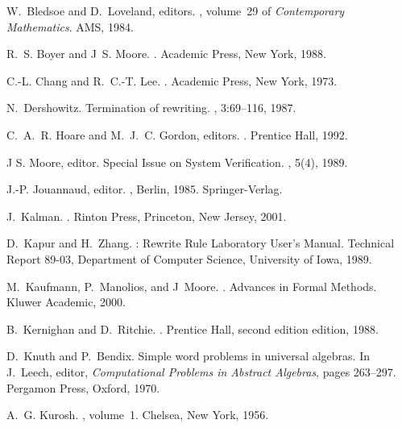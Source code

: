 \documentclass[11pt]{article}
\begin{document}
\begin{thebibliography}{10}

W.~Bledsoe and D.~Loveland, editors.
, volume~29 of {\em
  Contemporary Mathematics}.
\newblock AMS, 1984.

R.~S. Boyer and J~S. Moore.
.
\newblock Academic Press, New York, 1988.

C.-L. Chang and R.~C.-T. Lee.
.
\newblock Academic Press, New York, 1973.

N.~Dershowitz.
\newblock Termination of rewriting.
, 3:69--116, 1987.

C.~A.~R. Hoare and M.~J.~C. Gordon, editors.
.
\newblock Prentice Hall, 1992.

{J S. Moore, editor}.
\newblock Special {I}ssue on {S}ystem {V}erification.
, 5(4), 1989.

J.-P. Jouannaud, editor.
, Berlin, 1985. Springer-Verlag.

J.~Kalman.
.
\newblock Rinton Press, Princeton, New Jersey, 2001.

D.~Kapur and H.~Zhang.
: {R}ewrite {R}ule {L}aboratory {U}ser's {M}anual.
\newblock Technical Report 89-03, Department of Computer Science, University of
  Iowa, 1989.

M.~Kaufmann, P.~Manolios, and J~Moore.
.
\newblock Advances in Formal Methods. Kluwer Academic, 2000.

B.~Kernighan and D.~Ritchie.
.
\newblock Prentice Hall, second edition edition, 1988.

D.~Knuth and P.~Bendix.
\newblock Simple word problems in universal algebras.
\newblock In J.~Leech, editor, {\em Computational Problems in Abstract
  Algebras}, pages 263--297. Pergamon Press, Oxford, 1970.

A.~G. Kurosh.
, volume~1.
\newblock Chelsea, New York, 1956.


\end{thebibliography}
\end{document}

